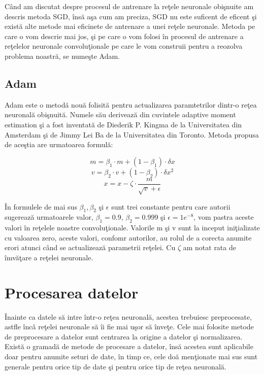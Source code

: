 C\^{a}nd am discutat despre procesul de antrenare la re\c{t}ele neuronale obi\c{s}nuite am descris metoda SGD, \^{i}ns\u{a} a\c{s}a cum am preciza, SGD nu este suficent de eficent \c{s}i exist\u{a} alte metode mai eficinete de antrenare a unei re\c{t}ele neuronale. Metoda pe care o vom descrie mai jos, \c{s}i pe care o vom folosi \^{i}n procesul de antrenare a re\c{t}elelor neuronale convolu\c{t}ionale pe care le vom construii pentru a reozolva problema noastr\u{a}, se nume\c{s}te Adam.

\subsection{Adam}

Adam este o metod\u{a} nou\u{a} folisit\u{a} pentru actualizarea paramtetrilor dintr-o re\c{t}ea neuronal\u{a} obi\c{s}nuit\u{a}. Numele s\u{a}u deriveaz\u{a} din cuvintele adaptive moment estimation \c{s}i a fost inventat\u{a} de Diederik P. Kingma de la Universitatea din Amsterdam \c{s}i de Jimmy Lei Ba de la Universitatea din Toronto. Metoda propusa de ace\c{s}tia are urmatoarea formul\u{a}:

$$ m = \beta_1 \cdot m + ( 1 - \beta_1 ) \cdot \delta x $$
$$ v = \beta_2 \cdot v + ( 1- \beta_2 ) \cdot \delta x^2 $$
$$ x = x - \zeta \cdot \frac{m}{\sqrt{v} + \epsilon } $$

\^{I}n formulele de mai sus $\beta_1, \beta_2 $ \c{s}i $ \epsilon $ sunt trei constante pentru care autorii sugereaz\u{a} urmatoarele valor, $\beta_1 = 0.9 $, $\beta_2 = 0.999 $ \c{s}i $ \epsilon = 1e^{-8} $, vom pastra aceste valori \^{i}n re\c{t}elele noastre convolu\c{t}ionale. Valorile m \c{s}i v sunt la inceput ini\c{t}ializate cu valoarea zero, aceste valori, confomr autorilor, au rolul de a corecta anumite erori atunci c\^{a}nd se actualizeaz\u{a} parametrii re\c{t}elei. Cu $\zeta$ am notat rata de \^{i}mv\u{a}\c{t}are a re\c{t}elei neuronale.

\section{Procesarea datelor}

\^{I}nainte ca datele s\u{a} intre \^{i}ntr-o re\c{t}ea neuronal\u{a}, acestea trebuiesc preprocesate, astfle \^{i}nc\^{a} re\c{t}elei neuronale s\u{a} \^{i}i fie mai u\c{s}or s\u{a} \^{i}nve\c{t}e. Cele mai folosite metode de preprocesare a datelor sunt centrarea la origine a datelor \c{s}i normalizarea. Exist\u{a} o gramad\u{a} de metode de procesare a datelor, \^{i}ns\u{a} acestea sunt aplicabile doar pentru anumite seturi de date, \^{i}n timp ce, cele do\u{a} men\c{t}ionate mai sus sunt generale pentru orice tip de date \c{s}i pentru orice tip de re\c{t}ea neuronal\u{a}.


